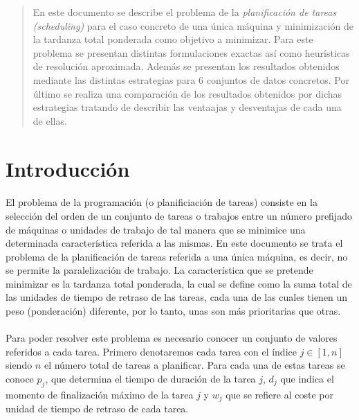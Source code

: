 \documentclass[spanish]{article}
\begin{document}
	\maketitle %

	\thispagestyle{fancy} %



	\begin{abstract}
		\noindent En este documento se describe el problema de la \emph{planificación de tareas (scheduling)} para el caso concreto de una única máquina y minimización de la tardanza total ponderada como objetivo a minimizar. Para este problema se presentan distintas formulaciones exactas así como heurísticas de resolución aproximada. Además se presentan los resultados obtenidos mediante las distintas estrategias para 6 conjuntos de datos concretos. Por último se realiza una comparación de los resultados obtenidos por dichas estrategias tratando de describir las ventaajas y desventajas de cada una de ellas.
	\end{abstract}


	\section{Introducción}
	\label{sec:intro}

		\paragraph{}
		El problema de la programación (o planificiación de tareas) consiste en la selección del orden de un conjunto de tareas o trabajos entre un número prefijado de máquinas o unidades de trabajo de tal manera que se minimice una determinada característica referida a las mismas. En este documento se trata el problema de la planificación de tareas referida a una única máquina, es decir, no se permite la paralelización de trabajo. La característica que se pretende minimizar es la tardanza total ponderada, la cual se define como la suma total de las unidades de tiempo de retraso de las tareas, cada una de las cuales tienen un peso (ponderación) diferente, por lo tanto, unas son más prioritarias que otras.

		\paragraph{}
		Para poder resolver este problema es necesario conocer un conjunto de valores referidos a cada tarea. Primero denotaremos cada tarea con el índice $j \in [1,n]$ siendo $n$ el número total de tareas a planificar. Para cada una de estas tareas se conoce $p_j$, que determina el tiempo de duración de la tarea $j$, $d_j$ que indica el momento de finalización máximo de la tarea $j$ y $w_j$ que se refiere al coste por unidad de tiempo de retraso de cada tarea.
\end{document}
